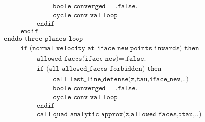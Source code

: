 \documentclass[./main.tex]{subfiles}
\begin{document}
\begin{align*}
&\hspace{4cm} \texttt{boole\_converged = .false.}\nonumber\\
&\hspace{4cm} \texttt{cycle conv\_val\_loop}\nonumber\\
&\hspace{3cm} \texttt{endif}\nonumber\\
&\hspace{2cm} \texttt{endif}\nonumber\\
&\hspace{1cm} \texttt{enddo three\_planes\_loop}\nonumber\\
&\hspace{2cm} \texttt{if (normal velocity at iface\_new points inwards) then}\nonumber\\
&\hspace{3cm} \texttt{allowed\_faces(iface\_new)=.false.}\nonumber\\
&\hspace{3cm} \texttt{if (all allowed\_faces forbidden) then}\nonumber\\
&\hspace{4cm} \texttt{call last\_line\_defense(z,tau,iface\_new,..)}\nonumber\\
&\hspace{4cm} \texttt{boole\_converged = .false.}\nonumber\\
&\hspace{4cm} \texttt{cycle conv\_val\_loop}\nonumber\\
&\hspace{3cm} \texttt{endif}\nonumber\\
&\hspace{3cm} \texttt{call quad\_analytic\_approx(z,allowed\_faces,dtau,..)}\nonumber\\
\end{align*}
\end{document}
